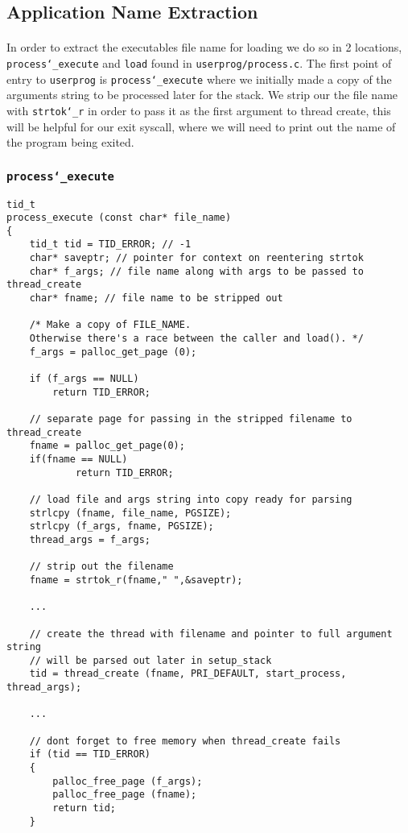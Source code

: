 \documentclass[]{article}
\begin{document}
   \newpage 
  \subsection{Application Name Extraction}
  \paragraph{}
  In order to extract the executables file name for loading we do so in 2 locations, \texttt{process\char`_execute} and \texttt{load} found in \texttt{userprog/process.c}. The first point of entry to \texttt{userprog} is \texttt{process\char`_execute} where we initially made a copy of the arguments string to be processed later for the stack. We strip our the file name with \texttt{strtok\char`_r} in order to pass it as the first argument to thread create, this will be helpful for our exit syscall, where we will need to print out the name of the program being exited.
  	\newpage
      \subsubsection{\texttt{process\char`_execute}}
              \lstset{language=C, tabsize=2}    
    \begin{lstlisting}
tid_t
process_execute (const char* file_name) 
{
	tid_t tid = TID_ERROR; // -1
	char* saveptr; // pointer for context on reentering strtok
	char* f_args; // file name along with args to be passed to thread_create
	char* fname; // file name to be stripped out
  
	/* Make a copy of FILE_NAME.
	Otherwise there's a race between the caller and load(). */
	f_args = palloc_get_page (0);
  	
	if (f_args == NULL)
		return TID_ERROR;
	
	// separate page for passing in the stripped filename to thread_create
	fname = palloc_get_page(0);
	if(fname == NULL)
			return TID_ERROR;
	
	// load file and args string into copy ready for parsing  
	strlcpy (fname, file_name, PGSIZE);
	strlcpy (f_args, fname, PGSIZE);
	thread_args = f_args;
  
	// strip out the filename
	fname = strtok_r(fname," ",&saveptr);
  
  	...
  
 	// create the thread with filename and pointer to full argument string
	// will be parsed out later in setup_stack
	tid = thread_create (fname, PRI_DEFAULT, start_process, thread_args);
  
	...
  
	// dont forget to free memory when thread_create fails
	if (tid == TID_ERROR)
	{
		palloc_free_page (f_args); 	
		palloc_free_page (fname); 		  
		return tid;	  
	}


    \end{lstlisting}
    \newpage
\end{document}
